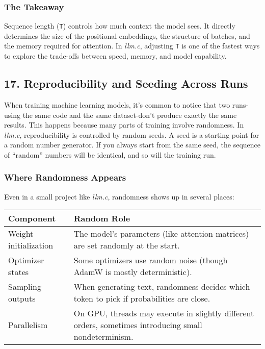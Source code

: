 \documentclass[
  letterpaper,
  DIV=11,
  numbers=noendperiod]{scrreprt}
\begin{document}
\subsubsection{The Takeaway}\label{the-takeaway-5}

Sequence length (\texttt{T}) controls how much context the model sees.
It directly determines the size of the positional embeddings, the
structure of batches, and the memory required for attention. In
\emph{llm.c}, adjusting \texttt{T} is one of the fastest ways to explore
the trade-offs between speed, memory, and model capability.

\subsection{17. Reproducibility and Seeding Across
Runs}\label{reproducibility-and-seeding-across-runs}

When training machine learning models, it's common to notice that two
runs-using the same code and the same dataset-don't produce exactly the
same results. This happens because many parts of training involve
randomness. In \emph{llm.c}, reproducibility is controlled by random
seeds. A seed is a starting point for a random number generator. If you
always start from the same seed, the sequence of ``random'' numbers will
be identical, and so will the training run.

\subsubsection{Where Randomness Appears}\label{where-randomness-appears}

Even in a small project like \emph{llm.c}, randomness shows up in
several places:

\begin{longtable}[]{@{}
  >{\raggedright\arraybackslash}p{}
  >{\raggedright\arraybackslash}p{}@{}}
\toprule\noalign{}
\begin{minipage}[b]{\linewidth}\raggedright
Component
\end{minipage} & \begin{minipage}[b]{\linewidth}\raggedright
Random Role
\end{minipage} \\
\midrule\noalign{}
\endhead
\bottomrule\noalign{}
\endlastfoot
Weight initialization & The model's parameters (like attention matrices)
are set randomly at the start. \\
Optimizer states & Some optimizers use random noise (though AdamW is
mostly deterministic). \\
Sampling outputs & When generating text, randomness decides which token
to pick if probabilities are close. \\
Parallelism & On GPU, threads may execute in slightly different orders,
sometimes introducing small nondeterminism. \\
\end{longtable}
\end{document}
